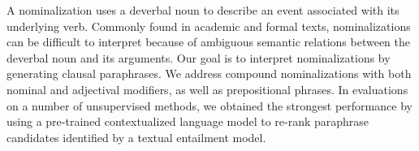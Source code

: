 A nominalization uses a deverbal noun to describe an event associated with its underlying verb.  Commonly found in academic and formal texts, nominalizations can be difficult to interpret because of ambiguous semantic relations between the deverbal noun and its arguments.  Our goal is to interpret nominalizations by generating clausal paraphrases.  We address compound nominalizations with both nominal and adjectival modifiers, as well as prepositional phrases.   In evaluations on a number of unsupervised methods, we obtained the strongest performance by using a pre-trained contextualized language model to re-rank paraphrase candidates identified by a textual entailment model.

